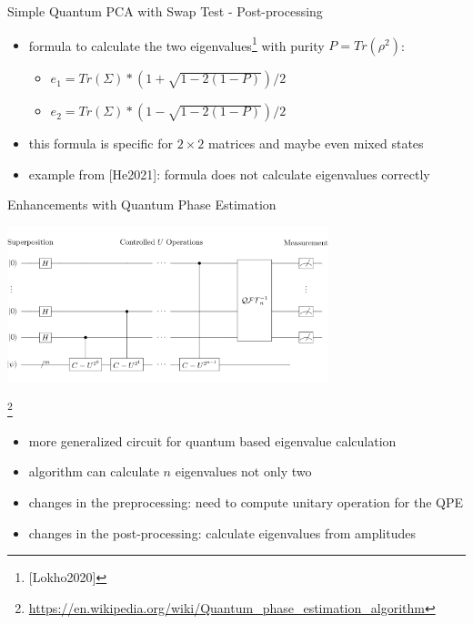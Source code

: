 \begin{frame}{Simple Quantum PCA with Swap Test - Post-processing}
  \begin{minipage}{1.0\textwidth}
    \begin{itemize}
      \item formula to calculate the two eigenvalues\footnote{[Lokho2020]} with purity $P = Tr(\rho^2)$:
      \begin{itemize}
        \item $e_1 = Tr(\Sigma) \ast (1 + \sqrt{1 - 2 (1 - P)}) / 2$
        \item $e_2 = Tr(\Sigma) \ast (1 - \sqrt{1 - 2 (1 - P)}) / 2$
      \end{itemize}
      \item this formula is specific for $2 \times 2$ matrices and maybe even mixed states
      \item example from [He2021]: formula does not calculate eigenvalues correctly
    \end{itemize}
  \end{minipage}
\end{frame}


\begin{frame}{Enhancements with Quantum Phase Estimation}
  \begin{minipage}{1.0\textwidth}
    \centering
    \includegraphics[width=0.7\textwidth]{../assets/wp_phase_estimation.png}
  \end{minipage}
  \footnote{\url{https://en.wikipedia.org/wiki/Quantum_phase_estimation_algorithm}}
  \begin{minipage}{1.0\textwidth}
    \begin{itemize}
      \item more generalized circuit for quantum based eigenvalue calculation
      \item algorithm can calculate $n$ eigenvalues not only two
      \item changes in the preprocessing: need to compute unitary operation for the QPE
      \item changes in the post-processing: calculate eigenvalues from amplitudes
    \end{itemize}
  \end{minipage}
\end{frame}
